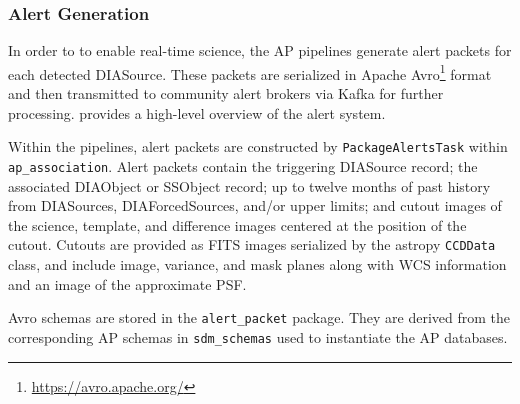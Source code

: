 \subsubsection{Alert Generation}
\label{sec:alerts}

In order to to enable real-time science, the AP pipelines generate alert packets for each detected DIASource.
These packets are serialized in Apache Avro\footnote{\url{https://avro.apache.org/}} format and then transmitted to community alert brokers via Kafka for further processing.
\citet{DMTN-093} provides a high-level overview of the alert system.

Within the pipelines, alert packets are constructed by \texttt{PackageAlertsTask} within \texttt{ap\_association}.
Alert packets contain the triggering DIASource record; the associated DIAObject or SSObject record; up to twelve months of past history from DIASources, DIAForcedSources, and/or upper limits; and cutout images of the science, template, and difference images centered at the position of the cutout.
Cutouts are provided as FITS images serialized by the astropy \texttt{CCDData} class, and include image, variance, and mask planes along with WCS information and an image of the approximate PSF.

Avro schemas are stored in the \texttt{alert\_packet} package.
They are derived from the corresponding AP schemas in \texttt{sdm\_schemas} used to instantiate the AP databases.
